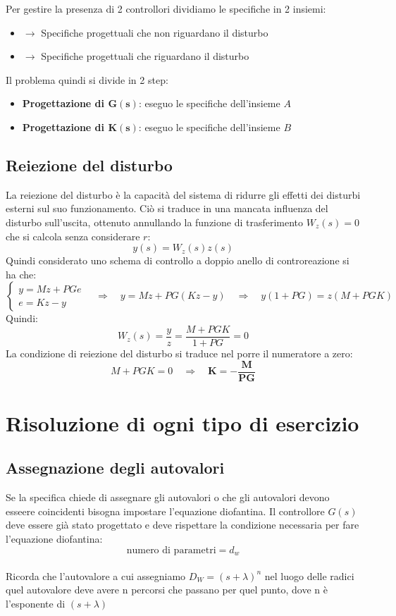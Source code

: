 \documentclass{report}
\theoremstyle{nostyle}
\begin{document}
\noindent Per gestire la presenza di 2 controllori dividiamo le specifiche in 2 insiemi:
\begin{itemize}
    \item [\textbf{A.}] $\to$ Specifiche progettuali che non riguardano il disturbo
    \item [\textbf{B.}] $\to$ Specifiche progettuali che riguardano il disturbo
\end{itemize}
Il problema quindi si divide in 2 step:
\begin{itemize}
    \item \textbf{Progettazione di $\bm{G(s)}$}: eseguo le specifiche dell'insieme $A$
    \item \textbf{Progettazione di $\bm{K(s)}$}: eseguo le specifiche dell'insieme $B$
\end{itemize}

\subsection{Reiezione del disturbo}
La reiezione del disturbo è la capacità del sistema di ridurre gli effetti dei disturbi esterni sul suo funzionamento. Ciò si traduce in una mancata influenza del disturbo sull'uscita, ottenuto annullando la funzione di 
trasferimento $W_z(s) = 0$ che si calcola senza considerare $r$:
\[      y(s) = W_z(s) z(s)    \]
Quindi considerato uno schema di controllo a doppio anello di controreazione si ha che:
\[\begin{cases}
    y = Mz + PGe \\
    e = Kz -y
\end{cases}  \quad \Longrightarrow \quad y = Mz + PG(Kz-y) \quad \Longrightarrow \quad y (1+PG) = z (M+PGK) 
\]
Quindi:
\[     W_z(s) = \frac{y}{z} = \frac{M+PGK}{1+PG}  = 0       \]
La condizione di reiezione del disturbo si traduce nel porre il numeratore a zero:
\[     M+PGK = 0\quad \Longrightarrow \quad \bm{K = - \frac{M}{PG}}         \]




\section{Risoluzione di ogni tipo di esercizio}
\subsection{Assegnazione degli autovalori}
Se la specifica chiede di assegnare gli autovalori o che gli autovalori devono esseere coincidenti bisogna impostare l'equazione diofantina. Il controllore $G(s)$ deve essere già stato
progettato e deve rispettare la condizione necessaria per fare l'equazione diofantina:
\[   \text{numero di parametri} = d_w    \]\\
Ricorda che l'autovalore a cui assegniamo $D_W=(s+\lambda)^n$ nel luogo delle radici quel autovalore deve avere n percorsi che passano per quel punto, dove n è l'esponente di $(s+\lambda)$
\end{document}
